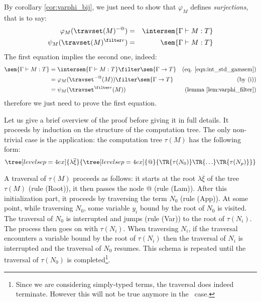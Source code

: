 
\begin{remark}
\label{rem:corresp_proofreduction}
    By corollary \ref{cor:varphi_bij}, we just need to show that
    $\varphi_M$ defines \emph{surjections}, that is to
    say:
    \begin{eqnarray*}
    \varphi_M(\travset(M)^{-@}) &=& \intersem{\Gamma \vdash M : T} \\
    \psi_M(\travset(M)^{\filter r}) &=& \sem{\Gamma \vdash M :
    T}
    \end{eqnarray*}
    The first equation implies the second one, indeed:
    \begin{align*}
    \sem{\Gamma \vdash M : T} &= \intersem{\Gamma \vdash M : T} \filter \sem{\Gamma \rightarrow T} & \mbox{(eq. \ref{eqn:int_std_gamsem})} \\
            &= \varphi_M(\travset^{-@}(M)) \filter \sem{\Gamma \rightarrow T} & \mbox{(by (i))}\\
            &= \psi_M(\travset^{\filter r}(M)) & \mbox{(lemma \ref{lem:varphi_filter})}
    \end{align*}
    therefore we just need to prove the first equation.
\end{remark}

    Let us give a brief overview of the proof before giving it in full details.
    It proceeds by induction on the structure of the computation tree.
    The only non-trivial case is the application: the computation tree
    $\tau(M)$ has the following form:
        $$ \tree[levelsep=4ex]{\lambda \overline{\xi}}
            { \tree[levelsep=4ex]{@}
                {   \TR{\tau(N_0)} \TR{\ldots} \TR{\tau(N_p)}}}
        $$

    A traversal of $\tau(M)$ proceeds as follows: it starts at the root $\lambda \overline{\xi}$ of the tree $\tau(M)$ (rule
    (Root)), it then passes the node @ (rule (Lam)).
    After this initialization part, it proceeds by traversing the term $N_0$ (rule (App)).
    At some point, while traversing $N_0$, some variable $y_i$ bound by the root of $N_0$ is visited. The traversal
    of $N_0$ is interrupted and jumps (rule (Var)) to the root of $\tau(N_i)$. The process then goes on with $\tau(N_i)$.
    When traversing $N_i$, if the traversal encounters a variable bound by the root of $\tau(N_i)$ then the traversal of $N_i$
    is interrupted and
    the traversal of $N_0$ resumes.  This schema is repeated until the traversal of $\tau(N_0)$ is completed\footnote{Since we are considering
    simply-typed terms, the traversal does indeed terminate. However this will not be true anymore in the \pcf\ case.}.

